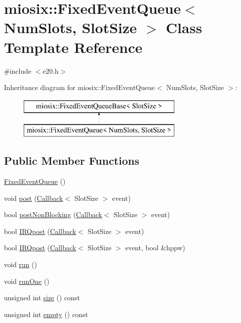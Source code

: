 \hypertarget{classmiosix_1_1_fixed_event_queue}{\section{miosix\-:\-:Fixed\-Event\-Queue$<$ Num\-Slots, Slot\-Size $>$ Class Template Reference}
\label{classmiosix_1_1_fixed_event_queue}
}


{\ttfamily \#include $<$e20.\-h$>$}

Inheritance diagram for miosix\-:\-:Fixed\-Event\-Queue$<$ Num\-Slots, Slot\-Size $>$\-:\begin{figure}[H]
\begin{center}
\leavevmode
\includegraphics[height=2.000000cm]{classmiosix_1_1_fixed_event_queue}
\end{center}
\end{figure}
\subsection*{Public Member Functions}
\begin{DoxyCompactItemize}
\item 
\hyperlink{classmiosix_1_1_fixed_event_queue_a7e27900a2e7c23cbe7155ec950f010ef}{Fixed\-Event\-Queue} ()
\item 
void \hyperlink{classmiosix_1_1_fixed_event_queue_a8ca9a4c812f569d8cf1e27f67cf9175d}{post} (\hyperlink{classmiosix_1_1_callback}{Callback}$<$ Slot\-Size $>$ event)
\item 
bool \hyperlink{classmiosix_1_1_fixed_event_queue_addf92b2a4f2f18057efb912f05ccf2d4}{post\-Non\-Blocking} (\hyperlink{classmiosix_1_1_callback}{Callback}$<$ Slot\-Size $>$ event)
\item 
bool \hyperlink{classmiosix_1_1_fixed_event_queue_a6a9c49cda044a0de508c2912dc116790}{I\-R\-Qpost} (\hyperlink{classmiosix_1_1_callback}{Callback}$<$ Slot\-Size $>$ event)
\item 
bool \hyperlink{classmiosix_1_1_fixed_event_queue_a707b2d5cfca7b04c738937d61d02adc8}{I\-R\-Qpost} (\hyperlink{classmiosix_1_1_callback}{Callback}$<$ Slot\-Size $>$ event, bool \&hppw)
\item 
void \hyperlink{classmiosix_1_1_fixed_event_queue_a57c1a42529747f00c9e2dfcbd0aadffe}{run} ()
\item 
void \hyperlink{classmiosix_1_1_fixed_event_queue_ae861b6c4a206878671abc5d7c302470f}{run\-One} ()
\item 
unsigned int \hyperlink{classmiosix_1_1_fixed_event_queue_a59ccdcb8e2a141fb72fb3f7e00f314e5}{size} () const 
\item 
unsigned int \hyperlink{classmiosix_1_1_fixed_event_queue_a44a72fcfb6cefdbc44b732da5cc4d2f5}{empty} () const 
\end{DoxyCompactItemize}


